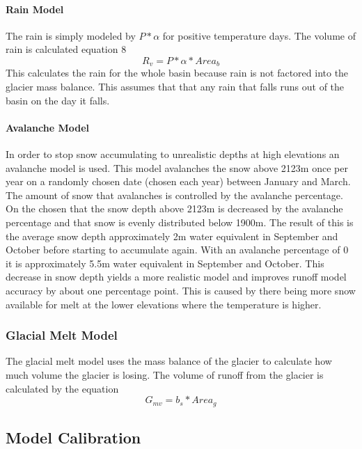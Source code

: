 \documentclass{article}
\begin{document}
\paragraph{Rain Model}
The rain is simply modeled by $P*\alpha$ for positive temperature days. The volume of rain is calculated equation 8
\begin{equation}R_{v}=P*\alpha*{Area}_{b}\end{equation}
This calculates the rain for the whole basin because rain is not factored into the glacier mass balance. This assumes that  that any rain 
that falls runs out of the basin on the day it falls.

\paragraph{Avalanche Model}
In order to stop snow accumulating to unrealistic depths at high elevations an avalanche model is used. This model avalanches the 
snow above 2123m once per year on a randomly chosen date (chosen each year) between January and March. The amount of snow that 
avalanches is controlled by the avalanche percentage. On the chosen that the snow depth above 2123m is decreased by the avalanche 
percentage and that snow is evenly distributed below 1900m. The result of this is the average snow depth approximately 2m water 
equivalent in September and October before starting to accumulate again. With an avalanche percentage of 0 it is approximately 5.5m water 
equivalent in September and October. This decrease in snow depth yields a more realistic model and improves runoff model accuracy by about 
one percentage point. This is caused by there being more snow available for melt at the lower elevations where the 
temperature is higher.

\subsubsection{Glacial Melt Model}
The glacial melt model uses the mass balance of the glacier to calculate how much volume the glacier is losing. The volume of runoff from the 
glacier is calculated by the equation
\begin{equation}G_{mv}=b_s*{Area}_{g}\end{equation}
\subsection{Model Calibration}
\end{document}
